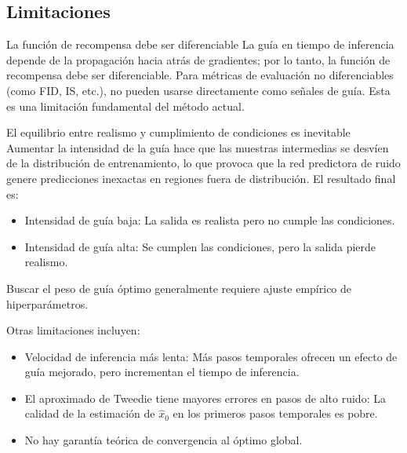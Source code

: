 \documentclass[a4paper]{article}
\begin{document}
\subsection{Limitaciones}

\begin{warningbox}{La función de recompensa debe ser diferenciable}
La guía en tiempo de inferencia depende de la propagación hacia atrás de gradientes; por lo tanto, la función de recompensa debe ser diferenciable. Para métricas de evaluación no diferenciables (como FID, IS, etc.), no pueden usarse directamente como señales de guía. Esta es una limitación fundamental del método actual.
\end{warningbox}

\begin{warningbox}{El equilibrio entre realismo y cumplimiento de condiciones es inevitable}
Aumentar la intensidad de la guía hace que las muestras intermedias se desvíen de la distribución de entrenamiento, lo que provoca que la red predictora de ruido genere predicciones inexactas en regiones fuera de distribución. El resultado final es:
\begin{itemize}
    \item Intensidad de guía baja: La salida es realista pero no cumple las condiciones.
    \item Intensidad de guía alta: Se cumplen las condiciones, pero la salida pierde realismo.
\end{itemize}
Buscar el peso de guía óptimo generalmente requiere ajuste empírico de hiperparámetros.
\end{warningbox}

Otras limitaciones incluyen:
\begin{itemize}
    \item Velocidad de inferencia más lenta: Más pasos temporales ofrecen un efecto de guía mejorado, pero incrementan el tiempo de inferencia.
    \item El aproximado de Tweedie tiene mayores errores en pasos de alto ruido: La calidad de la estimación de $\hat{x}_0$ en los primeros pasos temporales es pobre.
    \item No hay garantía teórica de convergencia al óptimo global.
\end{itemize}
\end{document}
